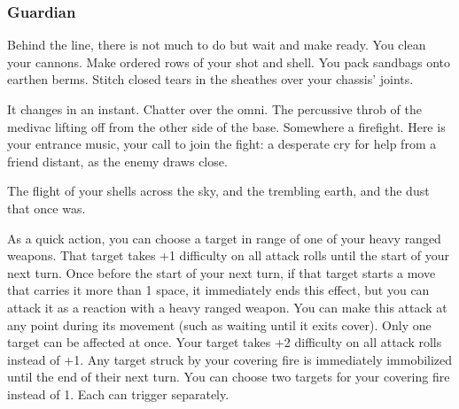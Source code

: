 \subsubsection{Guardian}
\begin{talent}
{Behind the line, there is not much to do but wait and make ready. You clean your cannons. Make ordered rows of your shot and shell. You pack sandbags onto earthen berms. Stitch closed tears in the sheathes over your chassis' joints.

It changes in an instant. Chatter over the omni. The percussive throb of the medivac lifting off from the other side of the base. Somewhere a firefight. Here is your entrance music, your call to join the fight: a desperate cry for help from a friend distant, as the enemy draws close.

The flight of your shells across the sky, and the trembling earth, and the dust that once was.}

As a quick action, you can choose a target in range of one of your heavy ranged weapons. That target takes +1 difficulty on all attack rolls until the start of your next turn. Once before the start of your next turn, if that target starts a move that carries it more than 1 space, it immediately ends this effect, but you can attack it as a reaction with a heavy ranged weapon. You can make this attack at any point during its movement (such as waiting until it exits cover). Only one target can be affected at once. 
Your target takes +2 difficulty on all attack rolls instead of +1. Any target struck by your covering fire is immediately immobilized until the end of their next turn. 
You can choose two targets for your covering fire instead of 1. Each can trigger separately.
\end{talent}